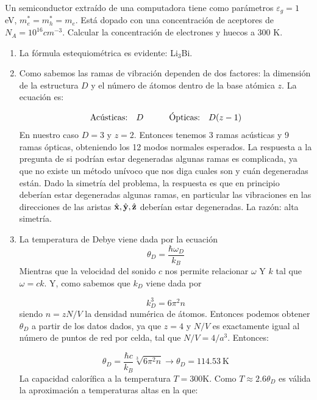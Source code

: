 \begin{ejercicio}
	Un semiconductor extraído de una computadora tiene como parámetros $\varepsilon_g = 1$ eV, $m_e^* = m_h^* = m_e$. Está dopado con una concentración de aceptores de $N_A = 10^{16} \unit{cm}^{-3}$. Calcular la concentración de electrones y huecos a 300 K. 
\end{ejercicio}	


\begin{solucion}
	\begin{enumerate}[label=\alph*)]
		\item La fórmula estequiométrica es evidente: Li$_3$Bi.
		\item Como sabemos las ramas de vibración dependen de dos factores: la dimensión de la estructura $D$ y el número de átomos dentro de la base atómica $z$. La ecuación es:
		
		\begin{equation}
			\text{Acústicas:} \quad D  \quad \quad \quad
			\text{Ópticas:} \quad D(z-1)
		\end{equation}
		En nuestro caso $D=3$ y $z=2$. Entonces tenemos 3 ramas acústicas y 9 ramas ópticas, obteniendo los 12 modos normales esperados. La respuesta a la pregunta de si podrían estar degeneradas algunas ramas es complicada, ya que no existe un método unívoco que nos diga cuales son y cuán degeneradas están. Dado la simetría del problema, la respuesta es que en principio deberían estar degeneradas algunas ramas, en particular las vibraciones en las direcciones de las aristas $\hat{\mathbf{x}},\hat{\mathbf{y}},\hat{\mathbf{z}}$ deberían estar degeneradas. La razón: alta simetría. 
		
		\item La temperatura de Debye viene dada por la ecuación
		\begin{equation*}
			\theta_D= \frac{\hbar \omega_D}{k_B}
		\end{equation*}
		Mientras que la velocidad del sonido $c$ nos permite relacionar $\omega$ Y $k$ tal que $\omega = c k$. Y, como sabemos que $k_D$ viene dada por
		
		\begin{equation*}
			k_D^3 = 6 \pi^2 n
		\end{equation*}
		siendo $n=zN/V$ la densidad numérica de átomos. Entonces podemos obtener $\theta_D$ a partir de los datos dados, ya que $z=4$ y $N/V$ es exactamente igual al número de puntos de red por celda, tal que $N/V=4/a^3$. Entonces:
		
		\begin{equation*}
			\theta_D = \frac{\hbar c}{k_B} \sqrt[3]{6\pi^2 n} \longrightarrow \theta_D = 114.53 \ \text{K}
		\end{equation*}
		La capacidad calorífica a la temperatura $T=300$K. Como $T\approx 2.6 \theta_D$ es válida la aproximación a temperaturas altas en la que:
		

\end{enumerate}
\end{solucion}
